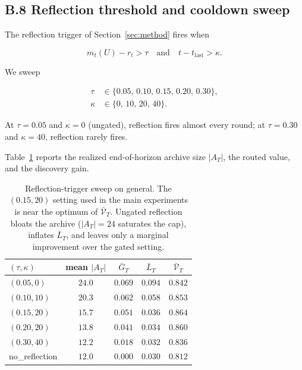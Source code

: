 \documentclass{article} %
\begin{document}
\subsection{B.8 Reflection threshold and cooldown sweep}

\label{app:reflection-sweep}

The reflection trigger of Section~\ref{sec:method} fires when

\begin{equation}
\label{eq:app-trigger-recap}
m_t(U)-r_t > \tau \quad\text{and}\quad t-t_{\text{last}}>\kappa.
\end{equation}

We sweep

\begin{align}
\label{eq:app-tau-grid}
\tau &\in \{0.05,\,0.10,\,0.15,\,0.20,\,0.30\},\\
\label{eq:app-kappa-grid}
\kappa &\in \{0,\,10,\,20,\,40\}.
\end{align}

At $\tau=0.05$ and $\kappa=0$ (ungated), reflection fires almost every round; at $\tau=0.30$ and $\kappa=40$, reflection rarely fires.

Table~\ref{tab:app-reflection} reports the realized end-of-horizon archive size $|A_T|$, the routed value, and the discovery gain.

\begin{table}[h]
\centering
\small
\begin{tabular}{lcccc}
\toprule
$(\tau,\kappa)$ & mean $|A_T|$ & $\bar{G}_T$ & $\bar{L}_T$ & $\bar{\mathcal{V}}_T$ \\
\midrule
$(0.05,0)$    & $24.0$ & $0.069$ & $0.094$ & $0.842$ \\
$(0.10,10)$   & $20.3$ & $0.062$ & $0.058$ & $0.853$ \\
$(0.15,20)$   & $15.7$ & $0.051$ & $0.036$ & $0.864$ \\
$(0.20,20)$   & $13.8$ & $0.041$ & $0.034$ & $0.860$ \\
$(0.30,40)$   & $12.2$ & $0.018$ & $0.032$ & $0.836$ \\
no\_reflection& $12.0$ & $0.000$ & $0.030$ & $0.812$ \\
\bottomrule
\end{tabular}
\caption{Reflection-trigger sweep on general. The $(0.15,20)$ setting used in the main experiments is near the optimum of $\bar{\mathcal{V}}_T$. Ungated reflection bloats the archive ($|A_T|=24$ saturates the cap), inflates $\bar{L}_T$, and leaves only a marginal improvement over the gated setting.}
\label{tab:app-reflection}
\end{table}
\end{document}
